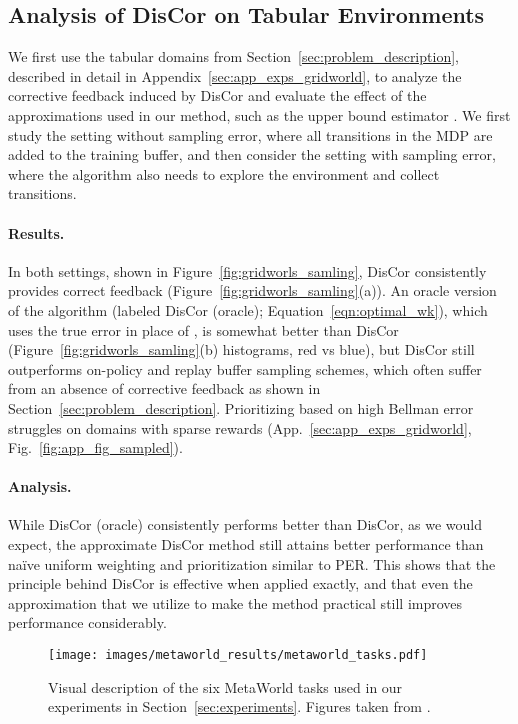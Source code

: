 \documentclass[jmlr]{article}
\begin{document}
\subsection{Analysis of DisCor on Tabular Environments}
\label{sec:gridworlds}

We first use the tabular domains from Section~\ref{sec:problem_description}, described in detail in Appendix~\ref{sec:app_exps_gridworld}, to analyze the corrective feedback induced by DisCor and evaluate the effect of the approximations used in our method, such as the upper bound estimator . We first study the setting without sampling error, where all transitions in the MDP are added to the training buffer, and then consider the setting with sampling error, where the algorithm also needs to explore the environment and collect transitions.

\paragraph{Results.} In both settings, shown in Figure~\ref{fig:gridworls_samling}, DisCor consistently provides correct feedback (Figure~\ref{fig:gridworls_samling}(a)). An oracle version of the algorithm (labeled DisCor (oracle); Equation~\ref{eqn:optimal_wk}), which uses the true error  in place of , is somewhat better than DisCor (Figure~\ref{fig:gridworls_samling}(b) histograms, red vs blue), but DisCor still outperforms on-policy and replay buffer sampling schemes, which often suffer from an absence of corrective feedback as shown in Section~\ref{sec:problem_description}.
Prioritizing based on high Bellman error struggles on domains with sparse rewards (App.~\ref{sec:app_exps_gridworld}, Fig.~\ref{fig:app_fig_sampled}). 

\paragraph{Analysis.} While DisCor (oracle) consistently performs better than DisCor, as we would expect, the approximate DisCor method still attains better performance than na\"{i}ve uniform weighting and prioritization similar to PER. This shows that the principle behind DisCor is effective when applied exactly, and that even the approximation that we utilize to make the method practical still improves performance considerably.

\begin{figure}[ht]
    \centering
    \texttt{[image: images/metaworld\_results/metaworld\_tasks.pdf]}
    \caption{\footnotesize{Visual description of the six MetaWorld tasks used in our experiments in Section~\ref{sec:experiments}. Figures taken from \cite{yu2019meta}.}}
    \label{fig:metaworld_tasks_main}
\end{figure}
\end{document}
